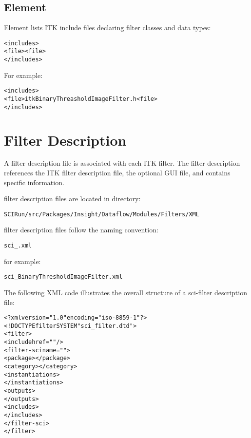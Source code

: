 \subsection{Element }
\label{sec:itk_mods:includes_element}

Element  lists ITK include files declaring filter
classes and data types:

\begin{alltt}
<includes>
  <file><file>
</includes>
\end{alltt}

For example:

\begin{alltt}
<includes>
  <file>itkBinaryThreasholdImageFilter.h<file>
</includes>
\end{alltt}


\section{\sr{} Filter Description}
\label{sec:itk_mods:sr_filter_desc}

A \sr{} filter description file is associated with each ITK filter.
The \sr{} filter description references the ITK filter description
file, the optional GUI file, and contains \sr{} specific information.

\sr{} filter description files are located in directory:

\begin{alltt}
  SCIRun/src/Packages/Insight/Dataflow/Modules/Filters/XML
\end{alltt}

\sr{} filter description files follow the naming convention:

\begin{alltt}
  sci\_.xml
\end{alltt}

for example:

\begin{alltt}
  sci\_BinaryThresholdImageFilter.xml
\end{alltt}


The following XML code illustrates the overall structure of a
sci-filter description file:

\begin{alltt}
  <?xml version="1.0" encoding="iso-8859-1"?>
  <!DOCTYPE filter SYSTEM "sci_filter.dtd">
  <filter>
    <include href=""/>
    \velide
    <filter-sci name="">
      <package></package>
      <category></category>
      <instantiations>
      \velide
      </instantiations>
      <outputs>
      \velide
      </outputs>
      <includes>
      \velide
      </includes>
    </filter-sci>
  </filter>
\end{alltt}

